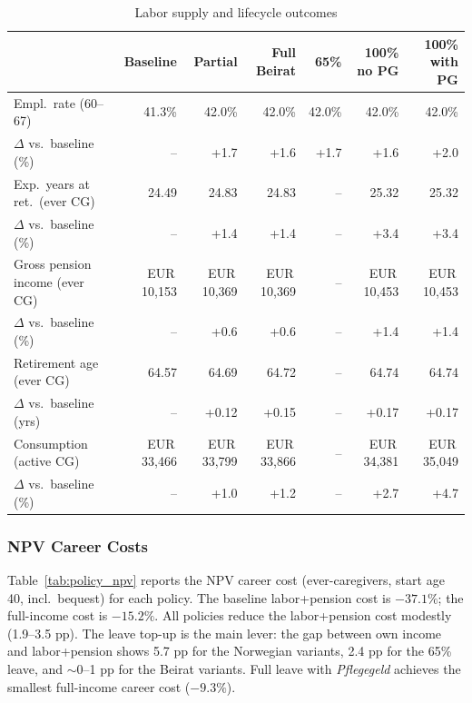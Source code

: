 \begin{table}[htbp]
  \centering
  \caption{Labor supply and lifecycle outcomes}
  \label{tab:policy_labor}
  \small
  \begin{tabular}{lrrrrrr}
    \toprule
    & Baseline & Partial & Full Beirat & 65\% & 100\% no PG & 100\% with PG \\
    \midrule
    Empl.\ rate (60--67) & 41.3\% & 42.0\% & 42.0\% & 42.0\% & 42.0\% & 42.0\% \\
    $\Delta$ vs.\ baseline (\%) & -- & +1.7 & +1.6 & +1.7 & +1.6 & +2.0 \\
    Exp.\ years at ret.\ (ever CG) & 24.49 & 24.83 & 24.83 & -- & 25.32 & 25.32 \\
    $\Delta$ vs.\ baseline (\%) & -- & +1.4 & +1.4 & -- & +3.4 & +3.4 \\
    Gross pension income (ever CG) & EUR\,10,153 & EUR\,10,369 & EUR\,10,369 & -- & EUR\,10,453 & EUR\,10,453 \\
    $\Delta$ vs.\ baseline (\%) & -- & +0.6 & +0.6 & -- & +1.4 & +1.4 \\
    Retirement age (ever CG) & 64.57 & 64.69 & 64.72 & -- & 64.74 & 64.74 \\
    $\Delta$ vs.\ baseline (yrs) & -- & +0.12 & +0.15 & -- & +0.17 & +0.17 \\
    Consumption (active CG) & EUR\,33,466 & EUR\,33,799 & EUR\,33,866 & -- & EUR\,34,381 & EUR\,35,049 \\
    $\Delta$ vs.\ baseline (\%) & -- & +1.0 & +1.2 & -- & +2.7 & +4.7 \\
    \bottomrule
  \end{tabular}
\end{table}

\subsubsection{NPV Career Costs}

Table~\ref{tab:policy_npv} reports the NPV career cost (ever-caregivers, start age 40, incl.\ bequest) for each policy. The baseline labor+pension cost is $-37.1\%$; the full-income cost is $-15.2\%$. All policies reduce the labor+pension cost modestly (1.9--3.5 pp). The leave top-up is the main lever: the gap between own income and labor+pension shows 5.7 pp for the Norwegian variants, 2.4 pp for the 65\% leave, and $\sim$0--1 pp for the Beirat variants. Full leave with \textit{Pflegegeld} achieves the smallest full-income career cost ($-9.3\%$).

